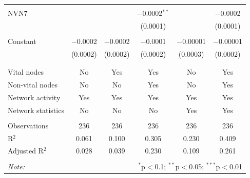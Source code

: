 \begin{table}[!htbp]
\begin{tabular}{@{\extracolsep{5pt}}lccccc}
  & & & & & \\ 
 NVN7 &  &  & $-$0.0002$^{**}$ &  & $-$0.0002 \\ 
  &  &  & (0.0001) &  & (0.0001) \\ 
  & & & & & \\ 
 Constant & $-$0.0002 & $-$0.0002 & $-$0.0001 & $-$0.00001 & $-$0.00001 \\ 
  & (0.0002) & (0.0002) & (0.0002) & (0.0003) & (0.0002) \\ 
  & & & & & \\ 
\hline \\[-1.8ex] 
Vital nodes & No & Yes & Yes & No & Yes \\ 
Non-vital nodes & No & No & Yes & No & Yes \\ 
Network activity & Yes & Yes & Yes & Yes & Yes \\ 
Network statistics & No & No & No & Yes & Yes \\ 
\hline &  &  &  &  &  \\ 
Observations & 236 & 236 & 236 & 236 & 236 \\ 
R$^{2}$ & 0.061 & 0.100 & 0.305 & 0.230 & 0.409 \\ 
Adjusted R$^{2}$ & 0.028 & 0.039 & 0.230 & 0.109 & 0.261 \\ 
\hline 
\hline \\[-1.8ex] 
\textit{Note:}  & \multicolumn{5}{r}{$^{*}$p$<$0.1; $^{**}$p$<$0.05; $^{***}$p$<$0.01} \\ 
\end{tabular} 
\end{table} 
